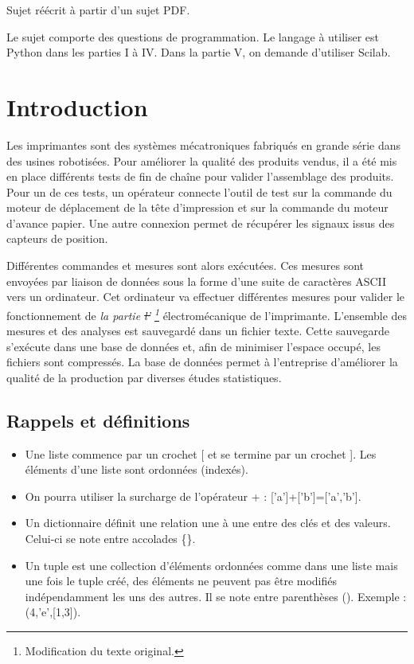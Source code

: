 \documentclass[10pt]{article}
\begin{document}


\begin{flushright}
Sujet réécrit à partir d'un sujet PDF.
\end{flushright}

 \renewcommand{\baselinestretch}{1.2}
\setlength{\parskip}{2ex plus 0.5ex minus 0.2ex}

Le sujet comporte des questions de programmation. Le langage à utiliser est Python dans les
parties I à IV. Dans la partie V, on demande d'utiliser Scilab.

\section*{Introduction}

Les imprimantes sont des systèmes mécatroniques fabriqués en grande série dans des usines
robotisées. Pour améliorer la qualité des produits vendus, il a été mis en place différents tests
de fin de chaîne pour valider l'assemblage des produits. Pour un de ces tests, un opérateur
connecte l'outil de test sur la commande du moteur de déplacement de la tête d'impression
et sur la commande du moteur d'avance papier. Une autre connexion permet de récupérer les
signaux issus des capteurs de position.

Différentes commandes et mesures sont alors exécutées. Ces mesures sont envoyées par
liaison de données sous la forme d'une suite de caractères ASCII vers un ordinateur.
Cet ordinateur va effectuer différentes mesures pour valider le fonctionnement de \textit{la partie \sout{l'} \footnote{Modification du texte original.}}  électromécanique de l'imprimante. L'ensemble des mesures et des analyses est sauvegardé dans un
fichier texte. Cette sauvegarde s'exécute dans une base de données et, afin de minimiser l'espace occupé, les fichiers sont compressés. La base de données permet à l'entreprise d'améliorer la qualité de la production par diverses études statistiques.


\subsection*{Rappels et définitions}

\begin{itemize}
\item Une liste commence par un crochet [ et se termine par un crochet ]. Les éléments d'une
liste sont ordonnées (indexés).
\item On pourra utiliser la surcharge de l'opérateur \textsf{+} : \textsf{['a']+['b']=['a','b']}.
\item Un dictionnaire définit une relation une à une entre des clés et des valeurs. Celui-ci se
note entre accolades \{\}.
\item Un tuple est une collection d'éléments ordonnées comme dans une liste mais une fois le
tuple créé, des éléments ne peuvent pas être modifiés indépendamment les uns des autres.
Il se note entre parenthèses (). Exemple : \textsf{(4,'e',[1,3])}.
\end{itemize}
\end{document}
